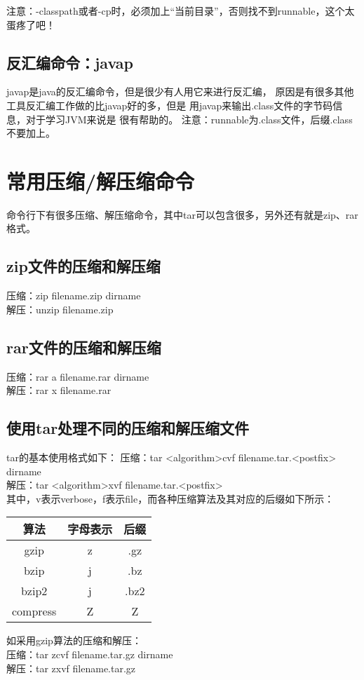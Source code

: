 ﻿\documentclass[a4paper,11pt]{article}
\begin{document}
  注意：-classpath或者-cp时，必须加上“当前目录”，否则找不到runnable，这个太蛋疼了吧！

  \subsection[反汇编命令：javap]{反汇编命令：javap}
  javap是java的反汇编命令，但是很少有人用它来进行反汇编，
  原因是有很多其他工具反汇编工作做的比javap好的多，但是
  用javap来输出.class文件的字节码信息，对于学习JVM来说是
  很有帮助的。
  注意：runnable为.class文件，后缀.class不要加上。

  \section[常用压缩/解压缩命令]{常用压缩/解压缩命令}
  命令行下有很多压缩、解压缩命令，其中tar可以包含很多，另外还有就是zip、rar格式。
  \subsection[zip文件的压缩和解压缩]{zip文件的压缩和解压缩}
  压缩：zip filename.zip dirname\\
  解压：unzip filename.zip
  \subsection[rar文件的压缩和解压缩]{rar文件的压缩和解压缩}
  压缩：rar a filename.rar dirname\\
  解压：rar x filename.rar
  \subsection[使用tar处理不同的压缩和解压缩文件]{使用tar处理不同的压缩和解压缩文件}
  tar的基本使用格式如下：
  压缩：tar <algorithm>cvf filename.tar.<postfix> dirname\\
  解压：tar <algorithm>xvf filename.tar.<postfix>\\
  其中，v表示verbose，f表示file，而各种压缩算法及其对应的后缀如下所示：\par
  \begin{center}
  \begin{tabular}{ccc}
    \hline
    算法 & 字母表示 & 后缀\\ \hline
    gzip & z & .gz\\
    bzip & j & .bz\\
    bzip2 & j & .bz2\\
    compress & Z & Z\\ \hline
  \end{tabular}
  \end{center}
  如采用gzip算法的压缩和解压：\\
  压缩：tar zcvf filename.tar.gz dirname\\
  解压：tar zxvf filename.tar.gz
\end{document}
